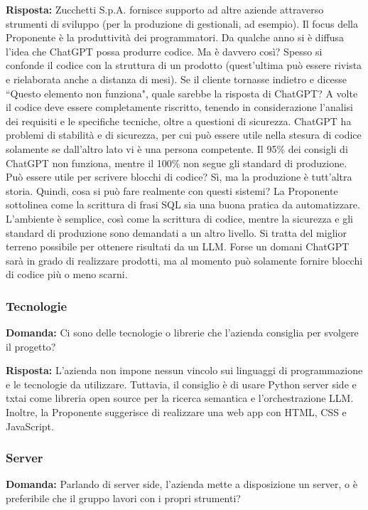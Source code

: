 \textbf{Risposta:} Zucchetti S.p.A. fornisce supporto ad altre aziende attraverso strumenti di sviluppo (per la produzione di gestionali, ad esempio). Il focus della Proponente è la produttività dei programmatori. Da qualche anno si è diffusa l’idea che ChatGPT possa produrre codice. Ma è davvero così? Spesso si confonde il codice con la struttura di un prodotto (quest’ultima può essere rivista e rielaborata anche a distanza di mesi). Se il cliente tornasse indietro e dicesse “Questo elemento non funziona", quale sarebbe la risposta di ChatGPT? A volte il codice deve essere completamente riscritto, tenendo in considerazione l’analisi dei requisiti e le specifiche tecniche, oltre a questioni di sicurezza. ChatGPT ha problemi di stabilità e di sicurezza, per cui può essere utile nella stesura di codice solamente se dall’altro lato vi è una persona competente. Il 95\% dei consigli di ChatGPT non funziona, mentre il 100\% non segue gli standard di produzione. Può essere utile per scrivere blocchi di codice? Sì, ma la produzione è tutt’altra storia. Quindi, cosa si può fare realmente con questi sistemi? La Proponente sottolinea come la scrittura di frasi SQL sia una buona pratica da automatizzare. L’ambiente è semplice, così come la scrittura di codice, mentre la sicurezza e gli standard di produzione sono demandati a un altro livello. Si tratta del miglior terreno possibile per ottenere risultati da un LLM. Forse un domani ChatGPT sarà in grado di realizzare prodotti, ma al momento può solamente fornire blocchi di codice più o meno scarni.

\subsubsection{Tecnologie}
\textbf{Domanda:} Ci sono delle tecnologie o librerie che l'azienda consiglia per svolgere il progetto?

\textbf{Risposta:} L’azienda non impone nessun vincolo sui linguaggi di programmazione e le tecnologie da utilizzare. Tuttavia, il consiglio è di usare Python server side e txtai come libreria open source per la ricerca semantica e l'orchestrazione LLM. Inoltre, la Proponente suggerisce di realizzare una web app con HTML, CSS e JavaScript.

\subsubsection{Server}
\textbf{Domanda:} Parlando di server side, l’azienda mette a disposizione un server, o è preferibile che il gruppo lavori con i propri strumenti?

